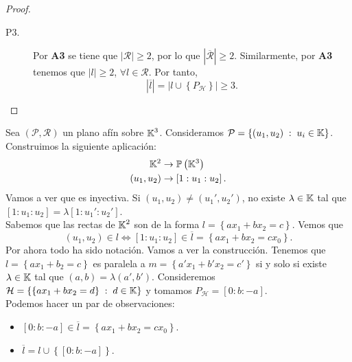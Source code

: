 \begin{proof}
\begin{description}
\begin{description}
	\end{description}
\item[P3.] Por \textbf{A3} se tiene que $\displaystyle \left|\mathcal{R}\right| \geq 2 $, por lo que $\displaystyle \left|\overline{\mathcal{R}}\right| \geq 2 $. Similarmente, por \textbf{A3} tenemos que $\displaystyle \left|l\right| \geq 2 $, $\displaystyle \forall l \in \mathcal{R} $. Por tanto, 
	\[ \left|\overline{l}\right| = \left|l \cup \left\{ P_{\mathcal{H}}\right\} \right| \geq 3 .\]
\end{description}
\end{proof}
\begin{eg}
	Sea $\displaystyle \left(\mathcal{P}, \mathcal{R}\right) $ un plano afín sobre $\displaystyle \mathbb{K}^{3} $. Consideramos $\displaystyle \mathcal{P} = \left\{ \left(u_{1}, u_{2}\right) \; : \; u_{i} \in \mathbb{K}\right\}  $. Construimos la siguiente aplicación:
		\[
		\begin{split}
			\mathbb{K}^{2} & \to \mathbb{P}\left(\mathbb{K}^{3}\right)\\
			\left(u_{1}, u_{2}\right) & \to \left[1 : u_{1} : u_{2}\right] .
		\end{split}
		\]
		Vamos a ver que es inyectiva. Si $\displaystyle \left(u_{1}, u_{2}\right) \neq \left(u_{1}', u_{2}'\right) $, no existe $\displaystyle \lambda \in \mathbb{K} $ tal que $\displaystyle [1: u_{1} : u_{2} ] = \lambda [1 : u_{1}' : u_{2}']$. \\
		Sabemos que las rectas de $\displaystyle \mathbb{K}^{2} $ son de la forma $\displaystyle l = \left\{ ax_{1} + bx_{2} = c\right\} $. Vemos que 
		\[\left(u_{1}, u_{2}\right) \in l \iff [1 : u_{1} : u_{2}] \in \overline{l} = \left\{ ax_{1} + bx_{2} = cx_{0}\right\}  .\]
		Por ahora todo ha sido notación. Vamos a ver la construcción. Tenemos que $\displaystyle l = \left\{ ax_{1} + b_{2} = c\right\}  $ es paralela a $\displaystyle m = \left\{ a'x_{1} + b'x_{2} = c'\right\}  $ si y solo si existe $\displaystyle \lambda \in \mathbb{K} $ tal que $\displaystyle \left(a,b\right) = \lambda \left(a',b'\right) $. Consideremos $\displaystyle \mathcal{H} = \left\{ \left\{ ax_{1} + bx_{2} = d\right\} \; : \; d \in \mathbb{K}\right\} $ y tomamos $\displaystyle P_{\mathcal{H}} = [0 : b : -a] $. \\
Podemos hacer un par de observaciones:
\begin{itemize}
	\item $\displaystyle \left[0 : b : -a\right] \in \overline{l} = \left\{ ax_{1} + bx_{2} = cx_{0}\right\}  $.
	\item $\displaystyle \overline{l} = l \cup \left\{ [0 : b : -a]\right\}  $.

\end{itemize}
\end{eg}
